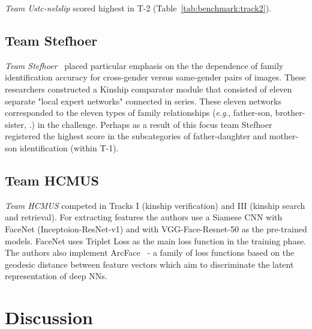 \documentclass[letterpaper, 10 pt, conference]{ieeeconf}  %
\def\etc{\latinabbrev{etc}.}
\newcommand{\eg}{\textit{e}.\textit{g}., }
\begin{document}
\emph{Team Ustc-nelslip} scored highest in T-2 (Table~\ref{tab:benchmark:track2}). 

\subsection{Team Stefhoer}
\emph{Team Stefhoer}~\cite{id2} placed particular emphasis on the the dependence of family identification accuracy for cross-gender versus same-gender pairs of images. These researchers constructed a Kinship comparator module that consisted of eleven separate "local expert networks" connected in series. These eleven networks corresponded to the eleven types of family relationships (\eg father-son, brother-sister, \etc) in the challenge. Perhaps as a result of this focus team Stefhoer registered the highest score in the subcategories of father-daughter and mother-son identification (within T-1).

\subsection{Team HCMUS}
\emph{Team HCMUS} \cite{id9} competed in Tracks I (kinship verification) and III (kinship search and retrieval). For extracting features the authors use a Siamese CNN with FaceNet (Inceptoion-ResNet-v1) and with VGG-Face-Resnet-50 as the pre-trained models. FaceNet uses Triplet Loss as the main loss function in the training phase. The authors also implement ArcFace~\cite{deng2019arcface} - a family of loss functions based on the geodesic distance between feature vectors which aim to discriminate the latent representation of deep NNs. 




\acresetall
\section{Discussion}\label{sec:discussion}
\end{document}
